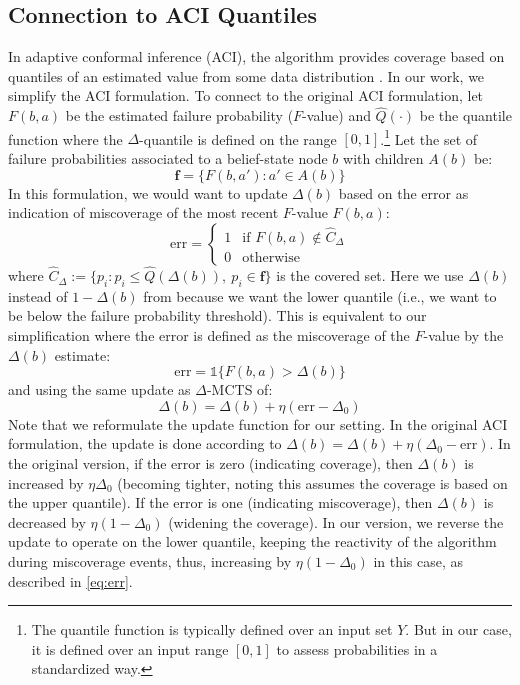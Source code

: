 \subsection{Connection to ACI Quantiles}
In adaptive conformal inference (ACI), the algorithm provides coverage based on quantiles of an estimated value from some data distribution \cite{gibbs2021adaptive}.
In our work, we simplify the ACI formulation.
To connect to the original ACI formulation, let $F(b,a)$ be the estimated failure probability ($F$-value) and $\widehat{Q}(\cdot)$ be the quantile function where the $\Delta$-quantile is defined on the range $[0,1]$.\footnote{The quantile function is typically defined over an input set $Y$. But in our case, it is defined over an input range $[0,1]$ to assess probabilities in a standardized way.}
Let the set of failure probabilities associated to a belief-state node $b$ with children $A(b)$ be:
\begin{equation}
    \mathbf{f} = \big\{F(b,a') : a' \in A(b)\big\}
\end{equation}
In this formulation, we would want to update $\Delta(b)$ based on the error as indication of miscoverage of the most recent $F$-value $F(b,a)$:
\begin{equation}
    \text{err} = \begin{cases}
        1 & \text{if } F(b,a) \not\in \widehat{C}_{\Delta} \\
        0 & \text{otherwise}
    \end{cases}
\end{equation}
where $\widehat{C}_{\Delta} := \big\{ p_i : p_i \le \widehat{Q}(\Delta(b)),\ p_i \in \mathbf{f} \big\}$ is the covered set. Here we use $\Delta(b)$ instead of $1 - \Delta(b)$ from \textcite{gibbs2021adaptive} because we want the lower quantile (i.e., we want to be below the failure probability threshold).
This is equivalent to our simplification where the error is defined as the miscoverage of the $F$-value by the $\Delta(b)$ estimate:
\begin{equation}
    \text{err} = \mathds{1}\{F(b,a) > \Delta(b)\}
\end{equation}
and using the same update as $\Delta$-MCTS of:
\begin{equation}
    \Delta(b) = \Delta(b) + \eta(\text{err} - \Delta_0)
\end{equation}
Note that we reformulate the update function for our setting.
In the original ACI formulation, the update is done according to $\Delta(b) = \Delta(b) + \eta(\Delta_0 - \text{err})$.
In the original version, if the error is zero (indicating coverage), then $\Delta(b)$ is increased by $\eta\Delta_0$ (becoming tighter, noting this assumes the coverage is based on the upper quantile).
If the error is one (indicating miscoverage), then $\Delta(b)$ is decreased by $\eta(1 - \Delta_0)$ (widening the coverage).
In our version, we reverse the update to operate on the lower quantile, keeping the reactivity of the algorithm during miscoverage events, thus, increasing by $\eta(1-\Delta_0)$ in this case, as described in \cref{eq:err}.



